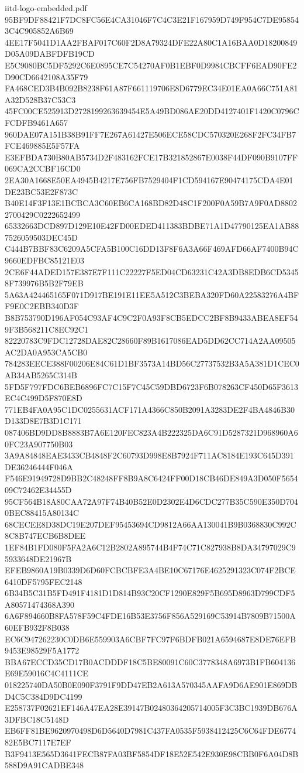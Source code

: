 \begin{filecontents*}[overwrite]{iitd-logo-embedded.pdf}
95BF9DF88421F7DC8FC56E4CA31046F7C4C3E21F167959D749F954C7DE958543C4C905852A6B69
4EE17F5041D1AA2FBAF017C60F2D8A79324DFE22A80C1A16BAA0D18200849D05A09DABFDFB19CD
E5C9080BC5DF5292C6E0895CE7C54270AF0B1EBF0D9984CBCFF6EAD90FE2D90CD6642108A35F79
FA468CED3B4B092B8238F61A87F661119706E8D6779EC34E01EA0A66C751A81A32D528B37C53C3
45FC00CE525913D2728199263639454E5A49BD086AE20DD4127401F1420C0796CFCDFB9461A657
960DAE07A151B38B91FF7E267A61427E506ECE58CDC570320E268F2FC34FB7FCE469885E5F57FA
E3EFBDA730B80AB5734D2F483162FCE17B321852867E0038F44DF090B9107FF069CA2CCBF16CD0
2EA30A1668E50EA4945B4217E756FB7529404F1CD594167E90474175CDA4E01DE23BC53E2F873C
B40E14F3F13E1BCBCA3C60EB6CA168BD82D48C1F200F0A59B7A9F0AD88022700429C0222652499
65332663DCD897D129E10E42FD00EDED411383BDBE71A1D47790125EA1AB887526059503DEC45D
C444B7BBF83C6209A5CFA5B100C16DD13F8F6A3A66F469AFD66AF7400B94C9660EDFBC85121E03
2CE6F44ADED157E387E7F111C22227F5ED04CD63231C42A3DB8EDB6CD53458F739976B5B2F79EB
5A63A424465165F071D917BE191E11EE5A512C3BEBA320FD60A22583276A4BFF9E0C2EBB340D3F
B8B753790D196AF054C93AF4C9C2F0A93F8CB5EDCC2BF8B9433ABEA8EF549F3B568211C8EC92C1
82220783C9FDC12728DAE82C28660F89B1617086EAD5DD62CC714A2AA09505AC2DA0A953CA5CB0
784283EECE388F00206E84C61D1BF3573A14BD56C27737532B3A5A381D1CEC0AB34AB5265C314B
5FD5F797FDC6BEB6896FC7C15F7C45C59DBD6723F6B078263CF450D65F3613EC4C499D5F870E8D
771EB4FA0A95C1DC0255631ACF171A4366C850B2091A3283DE2F4BA4846B30D133D8E7B3D1C171
087406BD9DD8B8883B7A6E120FEC823A4B222325DA6C91D5287321D968960A60FC23A907750B03
3A9A84848EAE3433CB4848F2C60793D998E8B7924F711AC8184E193C645D391DE36246444F046A
F546E91949728D9BB2C48248FF8B9A8C6424FF00D18CB46DE849A3D050F565409C72462E34455D
95CF564B18A80CAA72A97F74B40B52E0D2302E4D6CDC277B35C590E350D7040BEC88415A80134C
68CECEE8D38DC19E207DEF95453694CD9812A66AA130041B9B0368830C992C8C8B747ECB6B8DEE
1EF84B1FD080F5FA2A6C12B2802A895744B4F74C71C827938B8DA34797029C95933648DE21967B
EFEB9860A19B0339D6D60FCBCBFE3A4BE10C67176E4625291323C074F2BCE6410DF5795FEC2148
6B34B5C31B5FD491F4181D1D814B93C20CF1290E829F5B695D8963D799CDF5A80571474368A390
6A6F894660B8FA578F59C4FDE16B53E3756F856A529169C53914B7809B71500A60EFB932F8B038
EC6C947262230C0DB6E559903A6CBF7FC97F6BDFB021A6594687E8DE76EFB9453E98529F5A1772
BBA67ECCD35CD17B0ACDDDF18C5BE80091C60C3778348A6973B1FB604136E69E59016C4C4111CE
018225740DA50B0E090F3791F9DD47EB2A613A570345AAFA9D6AE901E869DBD4C5C384D9DC4199
E258737F02621EF146A47EA28E39147B02480364205714005F3C3BC1939DB676A3DFBC18C5148D
EB6FF81BE9620970498D6D5640D7981C437FA0535F5938412425C6C64FDE677482E5BC7117E7EF
B3F9413E565D3641FECB87FA03BF5854DF18E52E542E930E98CBB0F6A04D8B588D9A91CADBE348

\end{filecontents*}

